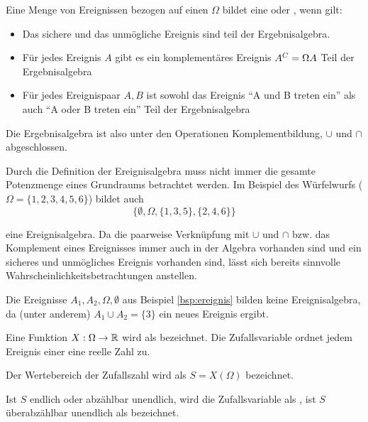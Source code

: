 \begin{definition}[Ereignisalgebra]\label{def:ealg}
Eine Menge von Ereignissen bezogen auf einen 
$\Omega$ bildet eine  oder , wenn gilt:

  \begin{itemize}
    \item Das sichere und das unmögliche Ereignis sind teil der Ergebnisalgebra.
    \item{Für jedes Ereignis $A$ gibt es ein komplementäres Ereignis $A^C =
\Omega \\ A$ Teil der Ergebnisalgebra}
    \item{Für jedes Ereignispaar $A,B$ ist sowohl das Ereignis "`A und B treten
ein"' als auch "`A oder B treten ein"' Teil der Ergebnisalgebra}
  \end{itemize}

Die Ergebnisalgebra ist also unter den Operationen Komplementbildung, $\cup$ und
$\cap$ abgeschlossen.
\end{definition}

\begin{example}
Durch die Definition der Ereignisalgebra muss nicht immer die gesamte Potenzmenge
eines Grundraums betrachtet werden. Im Beispiel des Würfelwurfs ($\Omega =
\{1,2,3,4,5,6\}$) bildet auch
\[\{\emptyset, \Omega, \{1,3,5\}, \{2,4,6\}\}\]

eine Ereignisalgebra. Da die paarweise Verknüpfung mit $\cup$ und $\cap$ bzw. das
Komplement eines Ereignisses immer auch in der Algebra vorhanden sind und ein
sicheres und unmögliches Ereignis vorhanden sind, lässt sich bereits sinnvolle
Wahrscheinlichkeitsbetrachtungen anstellen.

Die Ereignisse $A_1, A_2, \Omega, \emptyset$ aus Beispiel \ref{bsp:ereignis}
bilden keine Ereignisalgebra, da (unter anderem) $A_1 \cup A_2 = \{3\}$ ein
neues Ereignis ergibt.
\end{example}


\begin{definition}[Zufallsvariable]\label{def:zvar}
Eine Funktion $X: \Omega \to \mathbb{R}$ wird als 
bezeichnet. Die Zufallsvariable ordnet jedem Ereignis einer
 eine reelle Zahl zu.

Der Wertebereich der Zufallszahl wird als  $S = X(\Omega)$
bezeichnet.

Ist $S$ endlich oder abzählbar unendlich, wird die Zufallsvariable als
, ist $S$ überabzählbar unendlich als  bezeichnet.
\end{definition}

